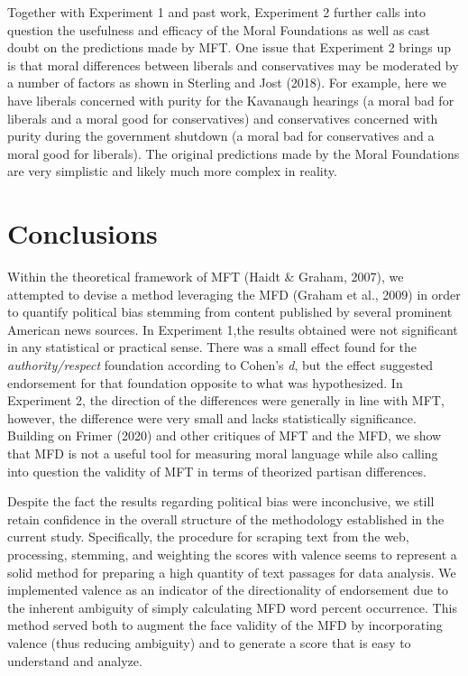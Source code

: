 \documentclass[
  english,
  man]{apa6}
\begin{document}
Together with Experiment 1 and past work, Experiment 2 further calls into question the usefulness and efficacy of the Moral Foundations as well as cast doubt on the predictions made by MFT. One issue that Experiment 2 brings up is that moral differences between liberals and conservatives may be moderated by a number of factors as shown in Sterling and Jost (2018). For example, here we have liberals concerned with purity for the Kavanaugh hearings (a moral bad for liberals and a moral good for conservatives) and conservatives concerned with purity during the government shutdown (a moral bad for conservatives and a moral good for liberals). The original predictions made by the Moral Foundations are very simplistic and likely much more complex in reality.

\hypertarget{conclusions}{%
\section{Conclusions}\label{conclusions}}

Within the theoretical framework of MFT (Haidt \& Graham, 2007), we attempted to devise a method leveraging the MFD (Graham et al., 2009) in order to quantify political bias stemming from content published by several prominent American news sources. In Experiment 1,the results obtained were not significant in any statistical or practical sense. There was a small effect found for the \emph{authority/respect} foundation according to Cohen's \emph{d}, but the effect suggested endorsement for that foundation opposite to what was hypothesized. In Experiment 2, the direction of the differences were generally in line with MFT, however, the difference were very small and lacks statistically significance. Building on Frimer (2020) and other critiques of MFT and the MFD, we show that MFD is not a useful tool for measuring moral language while also calling into question the validity of MFT in terms of theorized partisan differences.

Despite the fact the results regarding political bias were inconclusive, we still retain confidence in the overall structure of the methodology established in the current study. Specifically, the procedure for scraping text from the web, processing, stemming, and weighting the scores with valence seems to represent a solid method for preparing a high quantity of text passages for data analysis. We implemented valence as an indicator of the directionality of endorsement due to the inherent ambiguity of simply calculating MFD word percent occurrence. This method served both to augment the face validity of the MFD by incorporating valence (thus reducing ambiguity) and to generate a score that is easy to understand and analyze.
\end{document}
